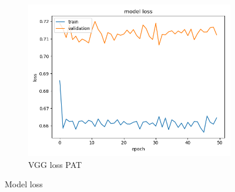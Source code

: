 \begin{figure}
\begin{subfigure}[b]{.3\linewidth}
\includegraphics[width=\linewidth]{Figs/vgg_pat_loss.jpg}
\caption{VGG loss PAT}
\end{subfigure}
\caption{Model loss}
\label{fig:loss}
\end{figure}


